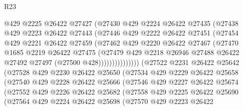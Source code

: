 \begin{lexlean}{R23}
\begin{coremodule}
                      @429
                      @2225
                      @26422
                      @27427
                      (@27430
                        @429
                        @2224
                        @26422
                        @27435
                        (@27438
                          @429
                          @2223
                          @26422
                          @27443
                          (@27446
                            @429
                            @2222
                            @26422
                            @27451
                            (@27454
                              @429
                              @2221
                              @26422
                              @27459
                              (@27462
                                @429
                                @2220
                                @26422
                                @27467
                                (@27470
                                  @1685
                                  @2219
                                  @26422
                                  @27475
                                  (@27479
                                    @429
                                    @2218
                                    @26946
                                    @27488
                                    @26422
                                    @27492
                                    @27497
                                    (@27500 @428)))))))))))))))
        (@27522
          @2231
          @26422
          @25642
          (@27528
            @429
            @2230
            @26422
            @25650
            (@27534
              @429
              @2229
              @26422
              @25658
              (@27540
                @429
                @2228
                @26422
                @25666
                (@27546
                  @429
                  @2227
                  @26422
                  @25674
                  (@27552
                    @429
                    @2226
                    @26422
                    @25682
                    (@27558
                      @429
                      @2225
                      @26422
                      @25690
                      (@27564
                        @429
                        @2224
                        @26422
                        @25698
                        (@27570
                          @429
                          @2223
                          @26422

\end{coremodule}
\end{lexlean}
